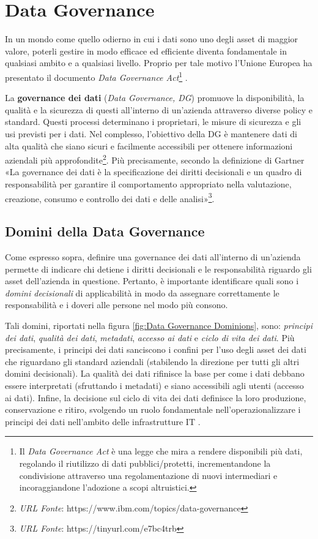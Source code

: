 \section{Data Governance}
In un mondo come quello odierno in cui i dati sono uno degli asset di maggior valore, poterli gestire in modo efficace ed efficiente diventa fondamentale in qualsiasi ambito e a qualsiasi livello. Proprio per tale motivo l'Unione Europea ha presentato il documento \textit{Data Governance Act}\footnote{Il \textit{Data Governance Act} è una legge che mira a rendere disponibili più dati, regolando il riutilizzo di dati pubblici/protetti, incrementandone la condivisione attraverso una regolamentazione di nuovi intermediari e incoraggiandone l'adozione a scopi altruistici.} \cite{europe_data_governance_act}.

La \textbf{governance dei dati} (\textit{Data Governance, DG}) promuove la disponibilità, la qualità e la sicurezza di questi all'interno di un'azienda attraverso diverse policy e standard. Questi processi determinano i proprietari, le misure di sicurezza e gli usi previsti per i dati. Nel complesso, l'obiettivo della DG è mantenere dati di alta qualità che siano sicuri e facilmente accessibili per ottenere informazioni aziendali più approfondite\footnote{\textit{URL Fonte}: https://www.ibm.com/topics/data-governance}.
Più precisamente, secondo la definizione di Gartner «La governance dei dati è la specificazione dei diritti decisionali e un quadro di responsabilità per garantire il comportamento appropriato nella valutazione, creazione, consumo e controllo dei dati e delle analisi»\footnote{\textit{URL Fonte}: https://tinyurl.com/e7bc4trb}.

\subsection{Domini della Data Governance}
Come espresso sopra, definire una governance dei dati all'interno di un'azienda permette di indicare chi detiene i diritti decisionali e le responsabilità riguardo gli asset dell'azienda in questione. Pertanto, è importante identificare quali sono i \textit{domini decisionali} di applicabilità in modo da assegnare correttamente le responsabilità e i doveri alle persone nel modo più consono. 

Tali domini, riportati nella figura \ref{fig:Data Governance Dominions}, sono: \textit{principi dei dati}, \textit{qualità dei dati}, \textit{metadati}, \textit{accesso ai dati} e \textit{ciclo di vita dei dati}. Più precisamente, i principi dei dati sanciscono i confini per l'uso degli asset dei dati che riguardano gli standard aziendali (stabilendo la direzione per tutti gli altri domini decisionali). La qualità dei dati rifinisce la base per come i dati debbano essere interpretati (sfruttando i metadati) e siano accessibili agli utenti (accesso ai dati). Infine, la decisione sul ciclo di vita dei dati definisce la loro produzione, conservazione e ritiro, svolgendo un ruolo fondamentale nell'operazionalizzare i principi dei dati nell'ambito delle infrastrutture IT \cite{data_governance_activities}.


